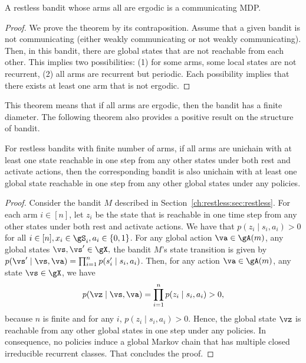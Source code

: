 \begin{thm}
    \label{thm:aperiodic_RB_comm} A restless bandit whose arms all are ergodic is a communicating MDP.
\end{thm}
\begin{proof}
    We prove the theorem by its contraposition. Assume that a given bandit is not communicating (either weakly communicating or not weakly communicating).
    Then, in this bandit, there are global states that are not reachable from each other.
    This implies two possibilities: (1) for some arms, some local states are not recurrent, (2) all arms are recurrent but periodic.
    Each possibility implies that there exists at least one arm that is not ergodic.
\end{proof}
This theorem means that if all arms are ergodic, then the bandit has a finite diameter.
The following theorem also provides a positive result on the structure of bandit.

\begin{thm}
    \label{thm:unichain}
    For restless bandits with finite number of arms, if all arms are unichain with at least one state reachable in one step from any other states under both rest and activate actions, then the corresponding bandit is also unichain with at least one global state reachable in one step from any other global states under any policies.
\end{thm}
\begin{proof}
    Consider the bandit $M$ described in Section~\ref{ch:restless:sec:restless}.
    For each arm $i\in[n]$, let $z_i$ be the state that is reachable in one time step from any other states under both rest and activate actions.
    We have that $p(z_i \mid s_i, a_i)>0$ for all $i\in[n], x_i\in\gS_i,a_i\in\{0,1\}$.
    For any global action $\va\in\gA(m)$, any global states $\vs,\vs'\in\gX,$ the bandit $M$'s state transition is given by ${p(\vs' \mid \vs, \va) =\prod_{i=1}^n p(s'_i \mid s_i, a_i)}$.
    Then, for any action $\va\in\gA(m)$, any state $\vs\in\gX$, we have
    \begin{align*}
        p(\vz \mid \vs, \va) =\prod_{i=1}^n p(z_i \mid s_i,a_i) > 0,
    \end{align*}
    because $n$ is finite and for any $i$, $p(z_i \mid s_i, a_i)>0$.
    Hence, the global state $\vz$ is reachable from any other global states in one step under any policies.
    In consequence, no policies induce a global Markov chain that has multiple closed irreducible recurrent classes.
    That concludes the proof.
\end{proof}

